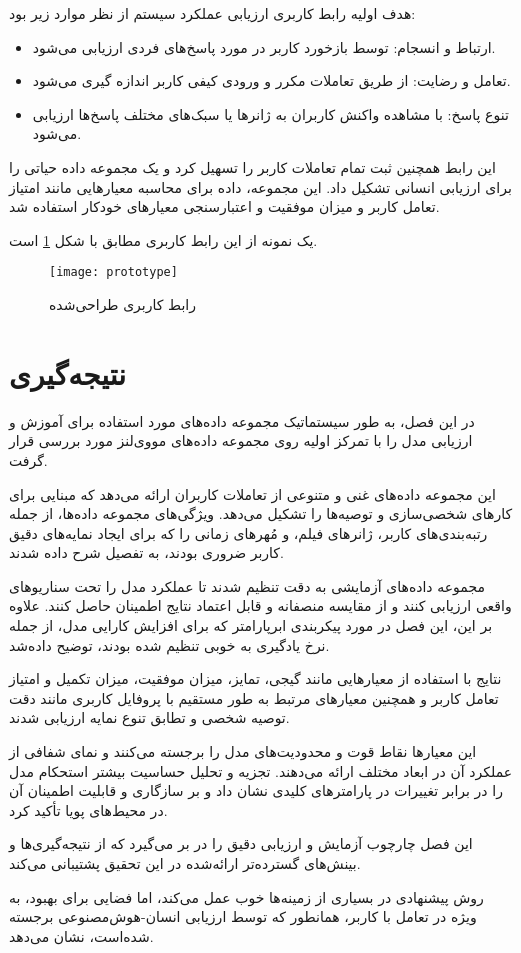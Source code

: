 هدف اولیه رابط کاربری ارزیابی عملکرد سیستم از نظر موارد زیر بود:
\begin{itemize}
\item
 ارتباط و انسجام: توسط بازخورد کاربر در مورد پاسخ‌های فردی ارزیابی می‌شود.
\item
 تعامل و رضایت: از طریق تعاملات مکرر و ورودی کیفی کاربر اندازه گیری می‌شود.
\item
 تنوع پاسخ: با مشاهده واکنش کاربران به ژانرها یا سبک‌های مختلف پاسخ‌ها ارزیابی می‌شود.
\end{itemize}

این رابط همچنین ثبت تمام تعاملات کاربر را تسهیل کرد و یک مجموعه داده حیاتی را برای ارزیابی انسانی تشکیل داد. این مجموعه، داده برای محاسبه معیارهایی مانند امتیاز تعامل کاربر و میزان موفقیت و اعتبارسنجی معیارهای خودکار استفاده شد.

یک نمونه از این رابط کاربری مطابق با شکل%
\ref{fig:MindMeldUi}
 است.

\begin{figure}[ht]
	\centerline{\texttt{[image: prototype]}}
	\caption{رابط کاربری طراحی‌شده}
	\label{fig:MindMeldUi}
\end{figure}



\section{نتیجه‌گیری}

در این فصل، به طور سیستماتیک مجموعه داده‌های مورد استفاده برای آموزش و ارزیابی مدل را با تمرکز اولیه روی مجموعه داده‌های مووی‌لنز مورد بررسی قرار گرفت. 

این مجموعه داده‌های غنی و متنوعی از تعاملات کاربران ارائه می‌دهد که مبنایی برای کارهای شخصی‌سازی و توصیه‌ها را تشکیل می‌دهد. ویژگی‌های مجموعه داده‌ها، از جمله رتبه‌بندی‌های کاربر، ژانرهای فیلم، و مُهرهای زمانی را که برای ایجاد نمایه‌های دقیق کاربر ضروری بودند، به تفصیل شرح داده شدند. 

مجموعه داده‌های آزمایشی به دقت تنظیم شدند تا عملکرد مدل را تحت سناریوهای واقعی ارزیابی کنند و از مقایسه منصفانه و قابل اعتماد نتایج اطمینان حاصل کنند. علاوه بر این، این فصل در مورد پیکربندی ابرپارامتر که برای افزایش کارایی مدل، از جمله نرخ یادگیری به خوبی تنظیم شده بودند، توضیح داده‌شد.

نتایج با استفاده از معیارهایی مانند گیجی، تمایز، میزان موفقیت، میزان تکمیل و امتیاز تعامل کاربر و همچنین معیارهای مرتبط به طور مستقیم با پروفایل کاربری مانند دقت توصیه شخصی و تطابق تنوع نمایه ارزیابی شدند. 

این معیارها نقاط قوت و محدودیت‌های مدل را برجسته می‌کنند و نمای شفافی از عملکرد آن در ابعاد مختلف ارائه می‌دهند. تجزیه و تحلیل حساسیت بیشتر استحکام مدل را در برابر تغییرات در پارامترهای کلیدی نشان داد و بر سازگاری و قابلیت اطمینان آن در محیط‌های پویا تأکید کرد. 

این فصل چارچوب آزمایش و ارزیابی دقیق را در بر می‌گیرد که از نتیجه‌گیری‌ها و بینش‌های گسترده‌تر ارائه‌شده در این تحقیق پشتیبانی می‌کند.

 روش پیشنهادی در بسیاری از زمینه‌ها خوب عمل می‌کند، اما فضایی برای بهبود، به ویژه در تعامل با کاربر، همانطور که توسط ارزیابی انسان-هوش‌مصنوعی برجسته شده‌است، نشان می‌دهد.



